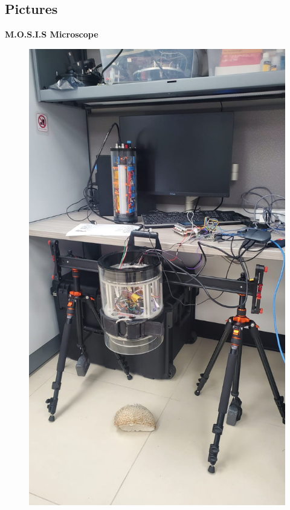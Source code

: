 \documentclass[17pt, aspectratio=169]{beamer}
\begin{document}
\subsection*{Pictures}
\begin{frame}
	\textbf{M.O.S.I.S Microscope}
	\begin{figure}
		\includegraphics[width=\textwidth, height=\textheight, keepaspectratio]{./Figures/MOSIS.jpg}

\end{figure}
\end{frame}
\end{document}
